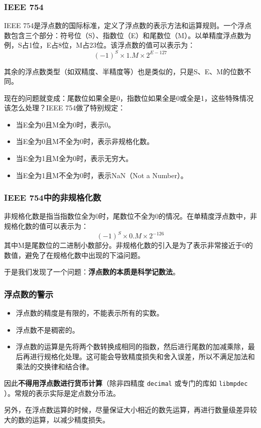 \documentclass[fontset=none,aspectratio=1610]{ctexbeamer}
\begin{document}
\begin{frame}
    \frametitle{IEEE 754}

    IEEE 754是浮点数的国际标准，定义了浮点数的表示方法和运算规则。一个浮点数包含三个部分：符号位（S）、指数位（E）和尾数位（M）。以单精度浮点数为例，S占1位，E占8位，M占23位。该浮点数的值可以表示为：
\[(-1)^S \times 1.M \times 2^{E - 127}\]

    其余的浮点数类型（如双精度、半精度等）也是类似的，只是S、E、M的位数不同。

    现在的问题就变成：尾数位如果全是0，指数位如果全是0或全是1，这些特殊情况该怎么处理？IEEE 754做了特别规定：
\begin{itemize}
    \item 当E全为0且M全为0时，表示0。
    \item 当E全为0且M不全为0时，表示非规格化数。
    \item 当E全为1且M全为0时，表示无穷大。
    \item 当E全为1且M不全为0时，表示NaN（Not a Number）。
\end{itemize}

\end{frame}

\begin{frame}
    \frametitle{IEEE 754中的非规格化数}

    非规格化数是指当指数位全为0时，尾数位不全为0的情况。在单精度浮点数中，非规格化数的值可以表示为：
\[(-1)^S \times 0.M \times 2^{-126}\]
    其中M是尾数位的二进制小数部分。非规格化数的引入是为了表示非常接近于0的数值，避免了在规格化数中出现的下溢问题。

    于是我们发现了一个问题：\textbf{浮点数的本质是科学记数法}。

\end{frame}

\begin{frame}
    \frametitle{浮点数的警示}

\begin{itemize}
    \item 浮点数的精度是有限的，不能表示所有的实数。
    \item 浮点数不是稠密的。
    \item 浮点数的运算是先将两个数转换成相同的指数，然后进行尾数的加减乘除，最后再进行规格化处理。这可能会导致精度损失和舍入误差，所以不满足加法和乘法的交换律和结合律。
\end{itemize}

因此\textbf{不得用浮点数进行货币计算}（除非四精度 \texttt{decimal} 或专门的库如 \texttt{libmpdec} ）。常规的表示实际是定点数分币法。

另外，在浮点数运算的时候，尽量保证大小相近的数先运算，再进行数量级差异较大的数的运算，以减少精度损失。

\end{frame}
\end{document}
